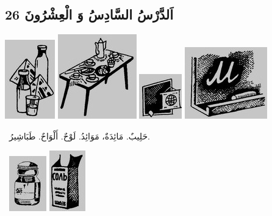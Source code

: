 \documentclass[a5paper]{article}
\begin{document}
\subsection{26 اَلدَّرْسُ السَّادِسُ وَ الْعِشْرُونَ}
 \includegraphics[width=0.8543in,height=1.3437in]{MuhammadBagauddinlatinized-img050.jpg}   \includegraphics[width=1.3437in,height=1.4374in]{MuhammadBagauddinlatinized-img051.jpg}   \includegraphics[width=0.7291in,height=0.7602in]{MuhammadBagauddinlatinized-img052.jpg}   \includegraphics[width=1.4063in,height=1.2189in]{MuhammadBagauddinlatinized-img053.jpg} 

\ حَلِيبٌ. مَائِدَةٌ، مَوَائِدُ. لَوْحٌ. أَلْوَاحٌ. طَبَاشِيرُ.

\  \includegraphics[width=0.6354in,height=0.9374in]{MuhammadBagauddinlatinized-img054.jpg}   \includegraphics[width=0.6146in,height=1.0311in]{MuhammadBagauddinlatinized-img055.jpg} 
\end{document}
